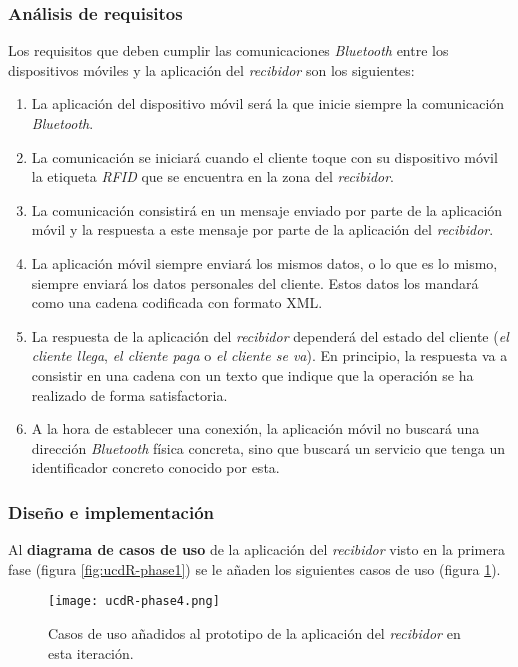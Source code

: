 \subsubsection{Análisis de requisitos}
Los requisitos que deben cumplir las comunicaciones \emph{Bluetooth} entre
los dispositivos móviles y la aplicación del \emph{recibidor} son los
siguientes:
\begin{enumerate}
\item La aplicación del dispositivo móvil será la que inicie siempre la
comunicación \emph{Bluetooth}.
\item La comunicación se iniciará cuando el cliente toque con su dispositivo
móvil la etiqueta \emph{RFID} que se encuentra en la zona del \emph{recibidor}.
\item La comunicación consistirá en un mensaje enviado por parte de la
aplicación móvil y la respuesta a este mensaje por parte de la aplicación
del \emph{recibidor}.
\item La aplicación móvil siempre enviará los mismos datos, o lo que es lo
mismo, siempre enviará los datos personales del cliente. Estos datos los
mandará como una cadena codificada con formato \acs{XML}.
\item La respuesta de la aplicación del \emph{recibidor} dependerá del estado
del cliente (\emph{el cliente llega}, \emph{el cliente paga} o \emph{el cliente
se va}). En principio, la respuesta va a consistir en una cadena con un texto
que indique que la operación se ha realizado de forma satisfactoria.
\item A la hora de establecer una conexión, la aplicación móvil no buscará una
dirección \emph{Bluetooth} física concreta, sino que buscará un servicio que
tenga un identificador concreto conocido por esta.
\end{enumerate}

\subsubsection{Diseño e implementación}
Al \textbf{diagrama de casos de uso} de la aplicación del \emph{recibidor}
visto en la primera fase (figura \ref{fig:ucdR-phase1}) se le añaden los
siguientes casos de uso (figura \ref{fig:ucdR-phase4}).

  \begin{figure}[!h]
    \begin{center}
      \texttt{[image: ucdR-phase4.png]}
      \caption{Casos de uso añadidos al prototipo de la aplicación
      del \emph{recibidor} en esta iteración.}
      \label{fig:ucdR-phase4}
    \end{center}
  \end{figure}

